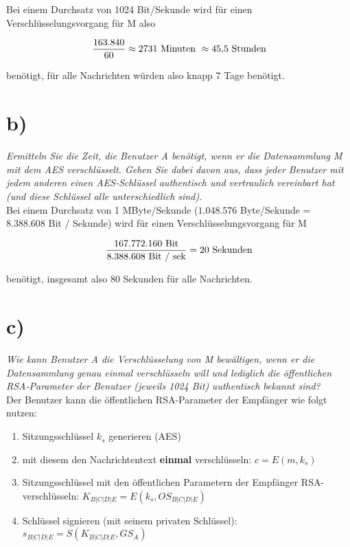 \noindent
Bei einem Durchsatz von 1024 Bit/Sekunde wird für einen Verschlüsselungsvorgang für M also

\begin{equation}\notag
\frac{163.840}{60} \approx 2731\ \text{Minuten}\ \approx 45{,}5 \ \text{Stunden}
\end{equation}

\noindent
benötigt, für alle Nachrichten würden also knapp 7 Tage benötigt.

\section{b)}
\textit{Ermitteln Sie die Zeit, die Benutzer A benötigt, wenn er die Datensammlung M
mit dem AES verschlüsselt. Gehen Sie dabei davon aus, dass jeder Benutzer mit
jedem anderen einen AES‐Schlüssel authentisch und vertraulich vereinbart hat
    (und diese Schlüssel alle unterschiedlich sind).}\\

\noindent
Bei einem Durchsatz von 1 MByte/Sekunde ($1.048.576$ Byte/Sekunde = $8.388.608$ Bit / Sekunde) wird für einen Verschlüsselungsvorgang für M

\begin{equation}\notag
\frac{167.772.160\ \text{Bit}}{8.388.608\ \text{Bit / sek}} = 20\ \text{Sekunden}
\end{equation}

\vspace{2mm}

\noindent
benötigt, insgesamt also 80 Sekunden für alle Nachrichten.

\section{c)}

\textit{Wie kann Benutzer A die Verschlüsselung von M bewältigen, wenn er die Datensammlung genau einmal verschlüsseln will und lediglich die öffentlichen RSA‐Parameter der Benutzer (jeweils 1024 Bit) authentisch bekannt sind?}\\

\noindent
Der Benutzer kann die öffentlichen RSA-Parameter der Empfänger wie folgt nutzen:

\begin{enumerate}
    \itemsep0.5em
    \item Sitzungsschlüssel $k_s$ generieren (AES)
    \item mit diesem den Nachrichtentext \textbf{einmal} verschlüsseln: $c = E(m, k_s)$
    \item Sitzungsschlüssel mit den öffentlichen Parametern der Empfänger RSA-verschlüsseln: $K_{B|C|D|E} = E(k_s, OS_{B|C|D|E})$
    \item Schlüssel signieren (mit seinem privaten Schlüssel): $s_{B|C|D|E} = S(K_{B|C|D|E}, GS_{A})$
\end{enumerate}

